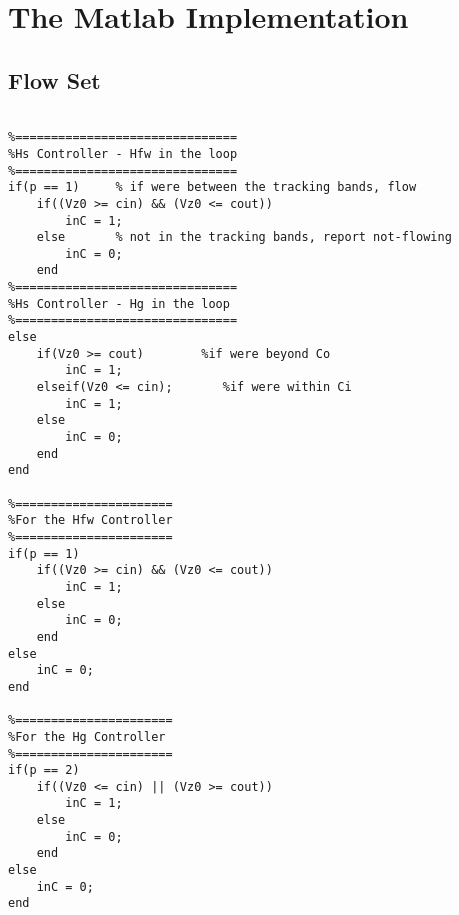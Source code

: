 
\chapter{The Matlab Implementation} %

\label{AppendixA} %



\lstset{
  style              = Matlab-editor,
  basicstyle         = \mlttfamily,
  escapechar         = ",
  mlshowsectionrules = true,
}

\section{Flow Set}
\begin{lstlisting}[label={lst:flowSetMatlab}]

%===============================
%Hs Controller - Hfw in the loop
%===============================
if(p == 1)     % if were between the tracking bands, flow
    if((Vz0 >= cin) && (Vz0 <= cout))
        inC = 1;  
    else	   % not in the tracking bands, report not-flowing
        inC = 0;
    end
%===============================
%Hs Controller - Hg in the loop
%===============================
else 
    if(Vz0 >= cout)        %if were beyond Co
        inC = 1;
    elseif(Vz0 <= cin);       %if were within Ci
        inC = 1;
    else 
        inC = 0;
    end
end
    
%======================
%For the Hfw Controller
%======================
if(p == 1)    
    if((Vz0 >= cin) && (Vz0 <= cout))
        inC = 1;
    else
        inC = 0;
    end
else
    inC = 0;
end

%======================
%For the Hg Controller
%======================
if(p == 2)
    if((Vz0 <= cin) || (Vz0 >= cout))
        inC = 1;
    else
        inC = 0;
    end
else
    inC = 0;
end

\end{lstlisting}

